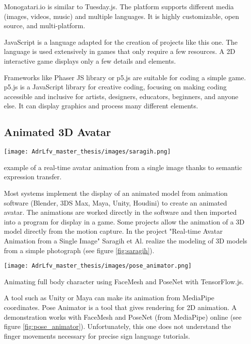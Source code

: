 Monogatari.io is similar to Tuesday.js. The platform supports different media (images, videos, music) and multiple languages. It is highly customizable, open source, and multi-platform. 

JavaScript is a language adapted for the creation of projects like this one. 
The language is used extensively in games that only require a few resources. A 2D interactive game displays only a few details and elements.

Frameworks like Phaser JS library or p5.js are suitable for coding a simple game. p5.js is a JavaScript library for creative coding, focusing on making coding accessible and inclusive for artists, designers, educators, beginners, and anyone else. It can display graphics and process many different elements.

\subsection{Animated 3D Avatar}

\begin{marginfigure}
    \centering
    \texttt{[image: AdrLfv\_master\_thesis/images/saragih.png]}
    \caption{example of a real-time avatar animation from a single image thanks to semantic expression transfer.}
    \label{fig:saragih}
\end{marginfigure}

Most systems implement the display of an animated model from animation software (Blender, 3DS Max, Maya, Unity, Houdini) to create an animated avatar. The animations are worked directly in the software and then imported into a program for display in a game. 
Some projects allow the animation of a 3D model directly from the motion capture. In the project "Real-time Avatar Animation from a Single Image" \cite{saragih2011real} Saragih et Al. realize the modeling of 3D models from a simple photograph (see figure \ref{fig:saragih}). 

\begin{marginfigure}
    \centering
    \texttt{[image: AdrLfv\_master\_thesis/images/pose\_animator.png]}
    \caption{Animating full body character using FaceMesh and PoseNet with TensorFlow.js.}
    \label{fig:pose_animator}
\end{marginfigure}

A tool such as Unity or Maya can make its animation from MediaPipe coordinates. Pose Animator is a tool that gives rendering for 2D animation. A demonstration works with FaceMesh and PoseNet (from MediaPipe) online \cite{pose_animator} (see figure \ref{fig:pose_animator}). Unfortunately, this one does not understand the finger movements necessary for precise sign language tutorials.


